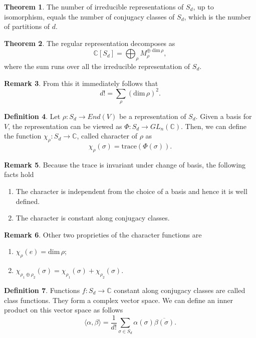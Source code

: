 \documentclass[12pt,a4paper,openright,twoside]{report}
\theoremstyle{definition} %
\newtheorem{theorem}{Theorem}[chapter]
\newtheorem{definition}[theorem]{Definition}
\newtheorem{remark}[theorem]{Remark}
\def \C {\mathbb{C}}
\begin{document}
\begin{theorem}
    The number of irreducible representations of \(S_d\), up to isomorphism, equals the number of conjugacy classes of \(S_d\), which is the number of partitions of \(d\).
\end{theorem}

\begin{theorem}
    The regular representation decomposes as
    \[
    \C[S_d] = \bigoplus_{\rho} M_{\rho}^{\oplus \; \text{dim}\, \rho},
    \]
    where the sum runs over all the irreducible representation of \(S_d\).
\end{theorem}

\begin{remark}
    From this it immediately follows that
    \[
    d! = \sum_{\rho} (\text{dim}\, \rho)^2.
    \]
\end{remark}

\begin{definition}
    Let \(\rho : S_d \to End(V)\) be a representation of \(S_d\). Given a basis for \(V\), the representation can be viewed as \(\Phi : S_d \to GL_n(\C)\). Then, we can define the function \(\chi_{\rho} : S_d \to \C\), called character of \(\rho\) as
    \[
    \chi_{\rho}(\sigma) = \text{trace}(\Phi(\sigma)).
    \]
\end{definition}

\begin{remark}
Because the trace is invariant under change of basis, the following facts hold
\begin{enumerate}
    \item The character is independent from the choice of a basis and hence it is well defined.
    \item The character is constant along conjugacy classes.
\end{enumerate}
\end{remark}

\begin{remark}
    Other two proprieties of the character functions are
    \begin{enumerate}
        \item \(\chi_{\rho}(e) = \text{dim} \, \rho\);
        \item \(\chi_{\rho_1 \oplus \rho_2}(\sigma) = \chi_{\rho_1}(\sigma) + \chi_{\rho_2}(\sigma) \).
    \end{enumerate}
\end{remark}

\begin{definition}
    Functions \(f : S_d \to \C\) constant along conjugacy classes are called class functions. They form a complex vector space. We can define an inner product on this vector space as follows
    \[
    \langle \alpha , \beta \rangle = \frac{1}{d!} \sum_{\sigma \in S_d} \alpha(\sigma) \overline{\beta(\sigma)}.
    \]
\end{definition}
\end{document}
